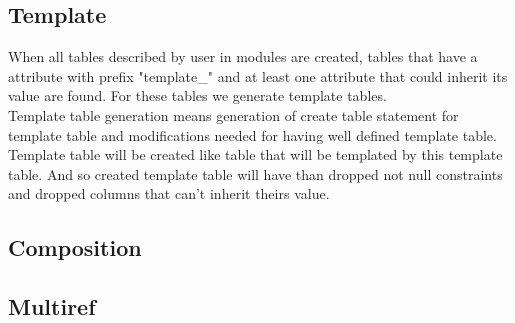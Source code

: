 \documentclass[deska]{subfiles}
\begin{document}

\subsection{Template}
When all tables described by user in modules are created, tables that have a attribute with prefix "template\_" and at least one attribute that could inherit its value are found. For these tables we generate template tables.\\
Template table generation means generation of create table statement for template table and modifications needed for having well defined template table.
Template table will be created like table that will be templated by this template table. And so created template table will have than dropped not null constraints and dropped columns that can't inherit theirs value.



\subsection{Composition}

\subsection{Multiref}
\end{document}
